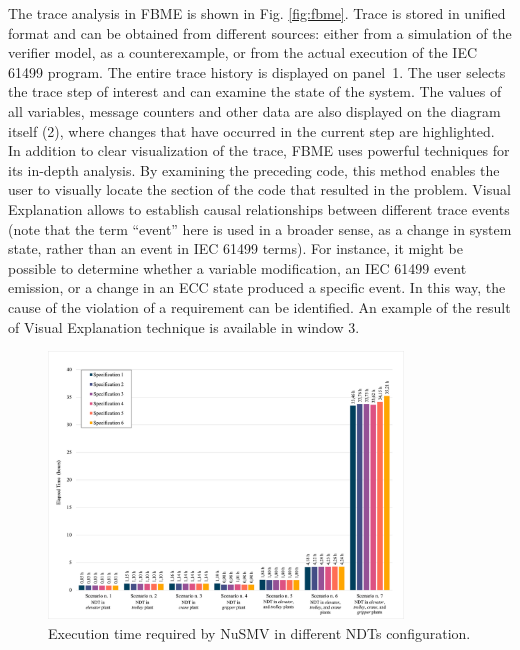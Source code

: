 \documentclass{ieeeojies}
\newcommand{\quotes}[1]{``#1''}
\begin{document}
\noindent The trace analysis in FBME is shown in Fig. \ref{fig:fbme}. Trace is stored in unified format \cite{liakh2022formal} and can be obtained from different sources: either from a simulation of the verifier model, as a counterexample, or from the actual execution of the IEC 61499 program. The entire trace history is displayed on \mbox{panel 1}. The user selects the trace step of interest and can examine the state of the system. The values of all variables, message counters and other data are also displayed on the diagram itself (2), where changes that have occurred in the current step are highlighted. 
In addition to clear visualization of the trace, FBME uses powerful techniques for its in-depth analysis. 
By examining the preceding code, this method enables the user to visually locate the section of the code that resulted in the problem. 
Visual Explanation allows to establish causal relationships between different trace events (note that the term  \quotes{event} here is used in a broader sense, as a change in system state, rather than an event in IEC 61499 terms). For instance, it might be possible to determine whether a variable modification, an IEC 61499 event emission, or a change in an ECC state produced a specific event. 
In this way, the cause of the violation of a requirement can be identified. An example of the result of Visual Explanation technique is available in window 3.

\begin{figure}
    \centering
    \includegraphics[width=0.84\textwidth]{pictures/lilli12.eps}
    \caption{Execution time required by NuSMV in different NDTs configuration.} 
    \label{fig:graph}
\end{figure}
\end{document}
